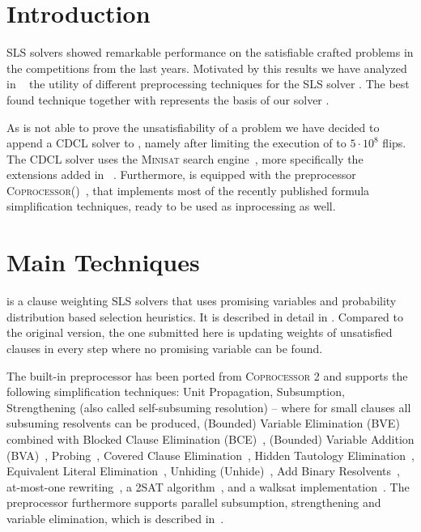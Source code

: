 \documentclass[conference]{IEEEtran}
\begin{document}
\section{Introduction}
SLS solvers showed remarkable performance on the satisfiable crafted problems in the competitions from the last years. 
Motivated by this results we have analyzed in ~\cite{bm-pos-2013} the utility of different preprocessing techniques for the SLS solver \sparrow. 
The best found technique together with \sparrow represents the basis of our solver \scp.

As \sparrow is not able to prove the unsatisfiability of a problem we have decided to append a CDCL solver to \scp, namely \riss after limiting the execution of \sparrow to $5\cdot10^8$ flips. 
The CDCL solver \riss uses the \textsc{Minisat} search engine~\cite{DBLP:conf/sat/EenS03}, more specifically the extensions added in \glucose~\cite{lbd,Audemard:2012:RRS:2405292.2405308}. 
Furthermore, \riss is equipped with the preprocessor \textsc{Coprocessor}(\cpt)~\cite{Manthey:2012:CFC:2352219.2352264}, that implements most of the recently published formula simplification techniques, ready to be used as inprocessing as well. 


\section{Main Techniques}

\sparrow is a clause weighting SLS solvers that uses promising variables and probability distribution based selection heuristics. It is described in detail in \cite{Balint:2010:ISL:2164073.2164078}. Compared to the original version, the one submitted here is updating weights of unsatisfied clauses in every step where no promising variable can be found. 

The built-in preprocessor \cpt has been ported from \textsc{Coprocessor 2} and supports the following simplification techniques:
Unit Propagation, Subsumption, Strengthening (also called self-subsuming resolution) -- where for small clauses all subsuming resolvents can be produced, 
{(Bounded) Variable Elimination} ({BVE})~\cite{Een:2005:EPS:2129929.2129935} combined with Blocked Clause Elimination (BCE)~\cite{Jarvisalo:2010:BCE:2175554.2175567}, 
{(Bounded) Variable Addition} ({BVA})~\cite{bva}, 
{Probing}~\cite{probing}, 
{Covered Clause Elimination}~\cite{DBLP:journals/corr/abs-1011-5202}, 
{Hidden Tautology Elimination}~\cite{Heule:2010:CEP:1928380.1928406}, 
{Equivalent Literal Elimination}~\cite{ee-withSCC}, 
{Unhiding} ({Unhide})~\cite{Heule:2011:ECS:2023474.2023497}, 
{Add Binary Resolvents}~\cite{Wei:2002:ARW:647489.727142}, 
at-most-one rewriting~\cite{ms-cspsat-2011,hau-encoding}, 
a 2SAT algorithm~\cite{DBLP:conf/aaai/Val00}, and a walksat implementation~\cite{DBLP:conf/aaai/SelmanKC94}. 
The preprocessor furthermore supports parallel subsumption, strengthening and variable elimination, which is described in~\cite{gm-pos-2013}. 
\end{document}
